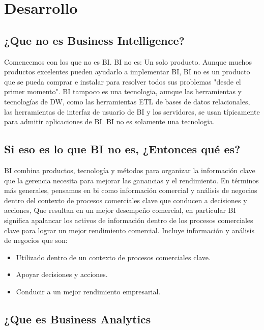 \documentclass[twoside,twocolumn]{article}
\begin{document}

\section{Desarrollo}

\subsection{¿Que no es Business Intelligence?}
Comencemos con los que no es BI. BI no es:
Un solo producto. Aunque muchos productos excelentes pueden ayudarlo a implementar BI, BI no es un producto que se pueda comprar e instalar para resolver todos sus problemas "desde el primer momento". BI tampoco es una tecnologia, aunque las herramientas y tecnologías de DW, como las herramientas ETL de bases de datos relacionales, las herramientas de interfaz de usuario de BI y los servidores, se usan típicamente para admitir aplicaciones de BI. BI no es solamente una tecnologia.

\subsection{Si eso es lo que BI no es, ¿Entonces qué es?}
BI combina productos, tecnología y métodos para organizar la información clave que la gerencia necesita para mejorar las ganancias y el rendimiento. En términos más generales, pensamos en bi como información comercial y análisis de negocios dentro del contexto de procesos comerciales clave que conducen a decisiones y acciones, Que resultan en un mejor desempeño comercial, en particular BI significa apalancar los activos de información dentro de los procesos comerciales clave para lograr un mejor rendimiento comercial. Incluye información y análisis de negocios que son:

\begin{itemize}	
	\item Utilizado dentro de un contexto de procesos comerciales clave.
	\item Apoyar decisiones y acciones.
	\item Conducir a un mejor rendimiento empresarial.

\end{itemize} 

\subsection{¿Que es Business Analytics}
\end{document}
